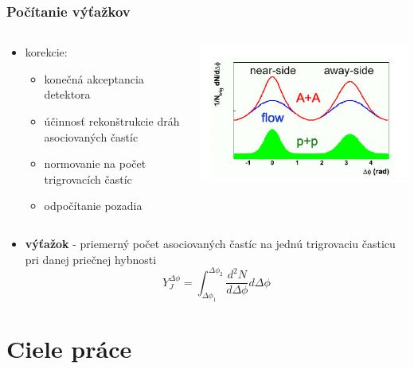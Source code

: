 \documentclass{beamer}
\begin{document}
	\begin{frame}
		\frametitle{Počítanie výťažkov}
		\begin{columns}
			\begin{column}{0.5\textwidth}
				\begin{itemize}
					\item korekcie:
					\begin{itemize}
						\item konečná akceptancia detektora
						\item účinnosť rekonštrukcie dráh asociovaných častíc
						\item normovanie na počet trigrovacích častíc
						\item odpočítanie pozadia
					\end{itemize}
				\end{itemize}
			\end{column}
		\begin{column}{0.5\textwidth}
			\centering \includegraphics[scale=0.5]{../Obrazky_praca/DetaPhiSchema.png}
		\end{column}
		\end{columns}
		\begin{itemize}
			\item {\bf výťažok} - priemerný počet asociovaných častíc na jednú trigrovaciu časticu pri danej priečnej hybnosti
			\begin{equation}
			Y_J^{\Delta\phi}=\int_{\Delta \phi_1}^{\Delta \phi_2} \frac{d^2N}{d\Delta \phi } d\Delta\phi 
			\label{yield}
			\end{equation} 
		\end{itemize}
	\end{frame}

\section{Ciele práce}
	
\end{document}
